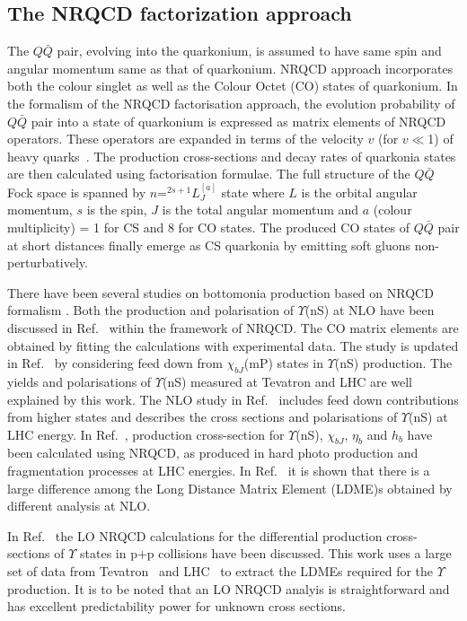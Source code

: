 \subsection{The NRQCD factorization approach}


The $Q\bar{Q}$ pair, evolving into the quarkonium,
is assumed to have same spin and angular momentum same as that of quarkonium.
NRQCD approach incorporates both the colour singlet as
well as the Colour Octet (CO) states of quarkonium.
In the formalism of the NRQCD factorisation approach, the evolution
probability of $Q\bar{Q}$ pair into a state of quarkonium is expressed as matrix
elements of NRQCD operators.
These operators are expanded
in terms of the velocity $v$ (for $v\ll$1) of heavy quarks~\cite{Bodwin:1994jh}.
The production cross-sections and decay rates of quarkonia states are then
calculated using factorisation formulae.
The full structure of the $Q\bar{Q}$ Fock space
is spanned by $n$=$^{2s+1}L_J^{[a]}$ state where $L$ is the orbital angular momentum, $s$
is the spin, $J$ is the total angular momentum
and $a$ (colour multiplicity) = 1 for CS and 8 for CO states. 
The produced CO states of $Q\bar{Q}$ pair at short distances finally emerge as 
CS quarkonia by emitting soft gluons non-perturbatively.


There have been several studies on bottomonia production based on
NRQCD formalism \cite{Domenech:1999qg,Domenech:2000ri,Braaten:2000cm,Gong:2010bk,Sharma:2012dy}.
Both the production and polarisation of $\Upsilon$(nS) at NLO have been discussed in 
Ref.~\cite{Gong:2013qka} within the framework of NRQCD.
The CO matrix elements are obtained by fitting the calculations with experimental data.
The study is updated in Ref.~\cite{Feng:2015wka} by considering
feed down from $\chi_{bJ}$(mP) states in $\Upsilon$(nS) production.
The yields and polarisations of $\Upsilon$(nS) measured at Tevatron and
LHC are well explained by this work.
The NLO study in Ref.~\cite{Han:2014kxa} includes feed down contributions
from higher states and describes the cross sections and
polarisations of $\Upsilon$(nS) at LHC energy.
In Ref.~\cite{Yu:2017pot}, production cross-section for $\Upsilon$(nS),
$\chi_{bJ}$, $\eta_b$ and $h_b$ have been calculated using NRQCD, as produced
in hard photo production and fragmentation processes at LHC energies. 
In Ref.~\cite{Kumar:2021sek} it is shown that there is a large difference among the
Long Distance Matrix Element (LDME)s obtained by different analysis at NLO.

In Ref.~\cite{Kumar:2021sek} the LO NRQCD calculations for the differential production
cross-sections of $\Upsilon$ states in p+p collisions have been discussed. 
This work uses a large set of data from Tevatron~\cite{Acosta:2001gv} and
LHC~\cite{CMS:2013qur,LHCb:2012aa,CMS:2015xqv,ATLAS:2012lmu,CMS:2017dju} 
to extract the LDMEs required for the $\Upsilon$ production.
It is to be noted that an LO NRQCD analyis is straightforward and has excellent
predictability power for unknown cross sections.

